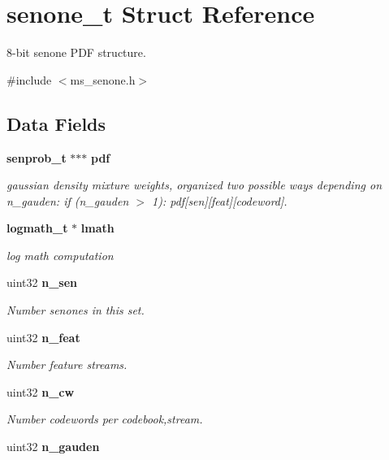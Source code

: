 \section{senone\-\_\-t Struct Reference}
\label{structsenone__t}


8-\/bit senone P\-D\-F structure.  




{\ttfamily \#include $<$ms\-\_\-senone.\-h$>$}

\subsection*{Data Fields}
\begin{DoxyCompactItemize}
\item 
{\bf senprob\-\_\-t} $\ast$$\ast$$\ast$ {\bf pdf}
\begin{DoxyCompactList}\small\item\em gaussian density mixture weights, organized two possible ways depending on n\-\_\-gauden\-: if (n\-\_\-gauden $>$ 1)\-: pdf[sen][feat][codeword]. \end{DoxyCompactList}\item 
{\bf logmath\-\_\-t} $\ast$ {\bf lmath}\label{structsenone__t_aa8621fab8c5b7a13493cae5549a5e0de}

\begin{DoxyCompactList}\small\item\em log math computation \end{DoxyCompactList}\item 
uint32 {\bf n\-\_\-sen}\label{structsenone__t_a769aa6d2fc16b33c0b9a1cbf31592422}

\begin{DoxyCompactList}\small\item\em Number senones in this set. \end{DoxyCompactList}\item 
uint32 {\bf n\-\_\-feat}\label{structsenone__t_a6a0aa50b8ff66e06f7305d1c8e4a17be}

\begin{DoxyCompactList}\small\item\em Number feature streams. \end{DoxyCompactList}\item 
uint32 {\bf n\-\_\-cw}\label{structsenone__t_a3c382a37dc9cb650d910bb881c52b336}

\begin{DoxyCompactList}\small\item\em Number codewords per codebook,stream. \end{DoxyCompactList}\item 
uint32 {\bf n\-\_\-gauden}\label{structsenone__t_a71cf7b41b2334216944380296c03c99a}


\end{DoxyCompactItemize}

